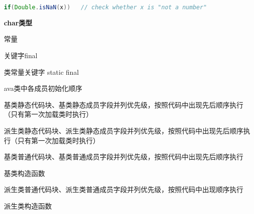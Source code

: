 \begin{lstlisting}[language=java]
        if(Double.isNaN(x))   // check whether x is "not a number"
\end{lstlisting}




\textbf{char类型}



常量

关键字final

类常量关键字 static final

ava类中各成员初始化顺序


基类静态代码块、基类静态成员字段并列优先级，按照代码中出现先后顺序执行（只有第一次加载类时执行）

派生类静态代码块、派生类静态成员字段并列优先级，按照代码中出现先后顺序执行（只有第一次加载类时执行）

基类普通代码块、基类普通成员字段并列优先级，按照代码中出现先后顺序执行

基类构造函数

派生类普通代码块、派生类普通成员字段并列优先级，按照代码中出现顺序执行

派生类构造函数

































